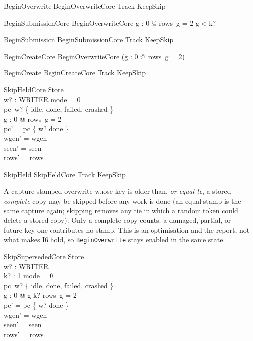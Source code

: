 \documentclass[a4paper,10pt,fleqn]{article}
\newcommand{\field}[1]{\texttt{#1}}
\begin{document}
\begin{zed}
BeginOverwrite  BeginOverwriteCore \land Track \land KeepSkip
\end{zed}

\begin{schema}{BeginSubmissionCore}
BeginOverwriteCore
\where
\forall g : 0  @ rows~g = 2 \implies g < k?
\end{schema}

\begin{zed}
BeginSubmission  BeginSubmissionCore \land Track \land KeepSkip
\end{zed}

\begin{schema}{BeginCreateCore}
BeginOverwriteCore
\where
\lnot (\exists g : 0  @ rows~g = 2)
\end{schema}

\begin{zed}
BeginCreate  BeginCreateCore \land Track \land KeepSkip
\end{zed}

\begin{schema}{SkipHeldCore}
\Delta Store \\ w? : WRITER
\where
mode = 0 \\
pc~w? \in \{ idle, done, failed, crashed \} \\
\exists g : 0  @ rows~g = 2 \\
pc' = pc \oplus \{ w? \mapsto done \} \\
wgen' = wgen \\
seen' = seen \\
rows' = rows
\end{schema}

\begin{zed}
SkipHeld  SkipHeldCore \land Track \land KeepSkip
\end{zed}

A capture-stamped overwrite whose key is older than, \emph{or equal to}, a
stored \emph{complete} copy may be skipped before any work is done (an equal
stamp is the same capture again; skipping removes any tie in which a random
token could delete a stored copy). Only a complete copy counts: a damaged,
partial, or future-key one contributes no stamp. This is an optimisation and
the report, not what makes I6 hold, so \field{BeginOverwrite} stays enabled in
the same state.

\begin{schema}{SkipSupersededCore}
\Delta Store \\ w? : WRITER \\ k? : 1 
\where
mode = 0 \\
pc~w? \in \{ idle, done, failed, crashed \} \\
\exists g : 0  @ g \geq k? \land rows~g = 2 \\
pc' = pc \oplus \{ w? \mapsto done \} \\
wgen' = wgen \\
seen' = seen \\
rows' = rows
\end{schema}
\end{document}

